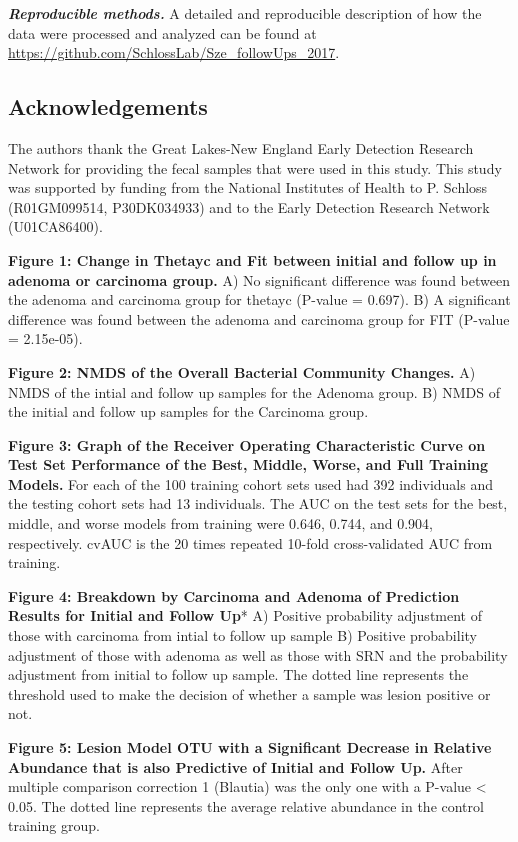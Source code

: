 \documentclass[12pt,]{article}
\begin{document}
\textbf{\emph{Reproducible methods.}} A detailed and reproducible
description of how the data were processed and analyzed can be found at
\url{https://github.com/SchlossLab/Sze_followUps_2017}.

\newpage

\subsection{Acknowledgements}\label{acknowledgements}

The authors thank the Great Lakes-New England Early Detection Research
Network for providing the fecal samples that were used in this study.
This study was supported by funding from the National Institutes of
Health to P. Schloss (R01GM099514, P30DK034933) and to the Early
Detection Research Network (U01CA86400).

\newpage

\textbf{Figure 1: Change in Thetayc and Fit between initial and follow
up in adenoma or carcinoma group.} A) No significant difference was
found between the adenoma and carcinoma group for thetayc (P-value =
0.697). B) A significant difference was found between the adenoma and
carcinoma group for FIT (P-value = 2.15e-05).

\textbf{Figure 2: NMDS of the Overall Bacterial Community Changes.} A)
NMDS of the intial and follow up samples for the Adenoma group. B) NMDS
of the initial and follow up samples for the Carcinoma group.

\textbf{Figure 3: Graph of the Receiver Operating Characteristic Curve
on Test Set Performance of the Best, Middle, Worse, and Full Training
Models.} For each of the 100 training cohort sets used had 392
individuals and the testing cohort sets had 13 individuals. The AUC on
the test sets for the best, middle, and worse models from training were
0.646, 0.744, and 0.904, respectively. cvAUC is the 20 times repeated
10-fold cross-validated AUC from training.

\textbf{Figure 4: Breakdown by Carcinoma and Adenoma of Prediction
Results for Initial and Follow Up}* A) Positive probability adjustment
of those with carcinoma from intial to follow up sample B) Positive
probability adjustment of those with adenoma as well as those with SRN
and the probability adjustment from initial to follow up sample. The
dotted line represents the threshold used to make the decision of
whether a sample was lesion positive or not.

\textbf{Figure 5: Lesion Model OTU with a Significant Decrease in
Relative Abundance that is also Predictive of Initial and Follow Up.}
After multiple comparison correction 1 (Blautia) was the only one with a
P-value \textless{} 0.05. The dotted line represents the average
relative abundance in the control training group.
\end{document}
